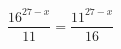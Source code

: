\begin{ex}[type=equation]
	\begin{condition}
		\( \dfrac{16^{27-x}}{11}=\dfrac{11^{27-x}}{16} \)
	\end{condition}
\end{ex}
